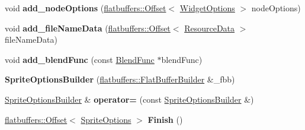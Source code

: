 \begin{DoxyCompactItemize}
\item 
\mbox{\label{structflatbuffers_1_1SpriteOptionsBuilder_a5bb16c3208419f55a49abf3c481e92dc}} 
void {\bfseries add\+\_\+node\+Options} (\hyperlink{structflatbuffers_1_1Offset}{flatbuffers\+::\+Offset}$<$ \hyperlink{structflatbuffers_1_1WidgetOptions}{Widget\+Options} $>$ node\+Options)
\item 
\mbox{\label{structflatbuffers_1_1SpriteOptionsBuilder_af457b10577a19e3badc71d8790dfbe08}} 
void {\bfseries add\+\_\+file\+Name\+Data} (\hyperlink{structflatbuffers_1_1Offset}{flatbuffers\+::\+Offset}$<$ \hyperlink{structflatbuffers_1_1ResourceData}{Resource\+Data} $>$ file\+Name\+Data)
\item 
\mbox{\label{structflatbuffers_1_1SpriteOptionsBuilder_af34c0fb4d6ad93d65080aff4015a3e5a}} 
void {\bfseries add\+\_\+blend\+Func} (const \hyperlink{structBlendFunc}{Blend\+Func} $\ast$blend\+Func)
\item 
\mbox{\label{structflatbuffers_1_1SpriteOptionsBuilder_a1f632d83e623aacad0696698aed4db78}} 
{\bfseries Sprite\+Options\+Builder} (\hyperlink{classflatbuffers_1_1FlatBufferBuilder}{flatbuffers\+::\+Flat\+Buffer\+Builder} \&\+\_\+fbb)
\item 
\mbox{\label{structflatbuffers_1_1SpriteOptionsBuilder_aa7f8fb3dda0999a17f806c733369eae8}} 
\hyperlink{structflatbuffers_1_1SpriteOptionsBuilder}{Sprite\+Options\+Builder} \& {\bfseries operator=} (const \hyperlink{structflatbuffers_1_1SpriteOptionsBuilder}{Sprite\+Options\+Builder} \&)
\item 
\mbox{\label{structflatbuffers_1_1SpriteOptionsBuilder_ae1a2bc2dbcdfa013f72059a443d2d912}} 
\hyperlink{structflatbuffers_1_1Offset}{flatbuffers\+::\+Offset}$<$ \hyperlink{structflatbuffers_1_1SpriteOptions}{Sprite\+Options} $>$ {\bfseries Finish} ()
\end{DoxyCompactItemize}
